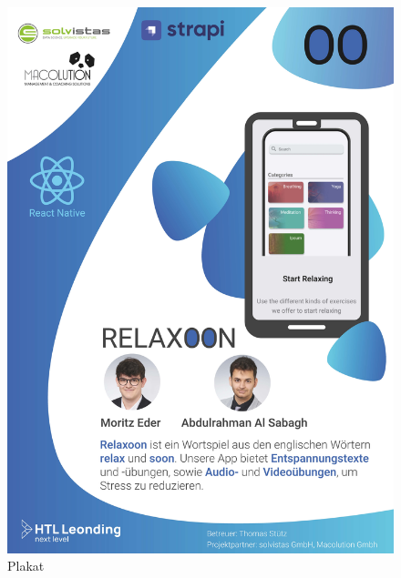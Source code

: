 \begin{figure}[H]
    \centering
    \includegraphics[height=1.4\textwidth]{./pics/Relaxoon-Plakat.jpg}
    \caption{Plakat}
\end{figure}





